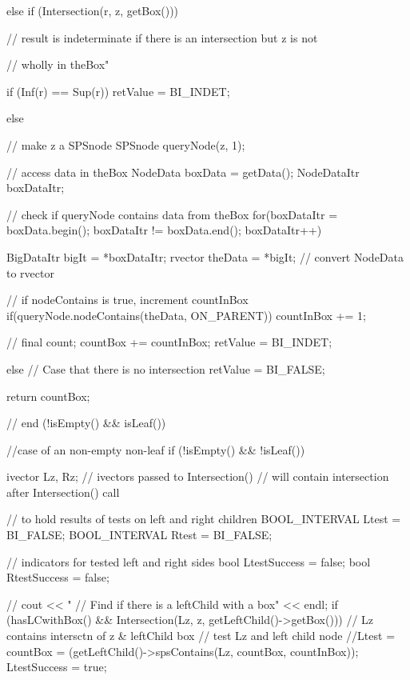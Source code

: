 \begin{DoxyCode}
{{            else if (Intersection(r, z, getBox())) {
            // result is indeterminate if there is an intersection but z is not
                   
        // wholly in theBox"
                
               if (Inf(r) == Sup(r)){
                  retValue = BI_INDET;
               }
 
               else{
            // make z a SPSnode
            SPSnode queryNode(z, 1);
  
            // access data in theBox
            NodeData boxData = getData();
            NodeDataItr boxDataItr;
                 
            // check if queryNode contains data from theBox
            for(boxDataItr = boxData.begin(); boxDataItr != boxData.end(); 
      boxDataItr++){
              BigDataItr bigIt = *boxDataItr; 
              rvector theData = *bigIt;  // convert NodeData to rvector
                     
              // if nodeContains is true, increment countInBox
              if(queryNode.nodeContains(theData, ON_PARENT)){
                countInBox += 1;
              }
            }                             
                
            // final count;
            countBox += countInBox;
            retValue = BI_INDET;
               }
            }
 
            else {
          // Case that there is no intersection
          retValue = BI_FALSE;
            }
            
           return countBox;
         } // end (!isEmpty() && isLeaf())
          
         //case of an non-empty non-leaf
         if (!isEmpty() && !isLeaf()) {
            ivector Lz, Rz; // ivectors passed to Intersection()
            // will contain intersection after Intersection() call
 
            // to hold results of tests on left and right children
            BOOL_INTERVAL Ltest = BI_FALSE;
            BOOL_INTERVAL Rtest = BI_FALSE;
 
            // indicators for tested left and right sides
            bool LtestSuccess = false;
            bool RtestSuccess = false;

 //        cout << "    // Find if there is a leftChild with a box" << endl;
           if (hasLCwithBox() &&
               Intersection(Lz, z, getLeftChild()->getBox())) {
               // Lz contains intersctn of z & leftChild box
               // test Lz and left child node
               //Ltest = 
               countBox =  (getLeftChild()->spsContains(Lz, countBox, 
      countInBox));
               LtestSuccess = true;
            }
                  
}}
\end{DoxyCode}
